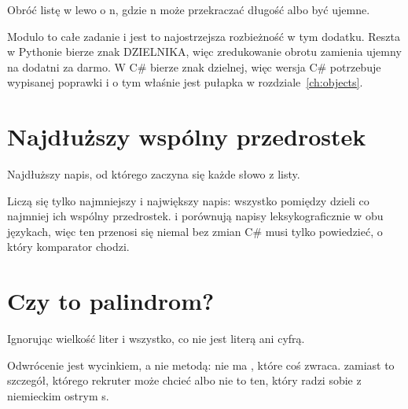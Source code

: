 \noindent
Obróć listę w lewo o n, gdzie n może przekraczać długość albo być ujemne.



\noindent
Modulo to całe zadanie i jest to najostrzejsza rozbieżność w tym dodatku. Reszta w Pythonie bierze znak DZIELNIKA, więc zredukowanie obrotu zamienia ujemny na dodatni za darmo. W C\# bierze znak dzielnej, więc wersja C\# potrzebuje wypisanej poprawki \dash{} i o tym właśnie jest pułapka w rozdziale~\ref{ch:objects}.

\section{Najdłuższy wspólny przedrostek}
\label{sec:appD-prefix}

\noindent
Najdłuższy napis, od którego zaczyna się każde słowo z listy.



\noindent
Liczą się tylko najmniejszy i największy napis: wszystko pomiędzy dzieli co najmniej ich wspólny przedrostek.  i  porównują napisy leksykograficznie w obu językach, więc ten przenosi się niemal bez zmian \dash{} C\# musi tylko powiedzieć, o który komparator chodzi.

\section{Czy to palindrom?}
\label{sec:appD-palindrome}

\noindent
Ignorując wielkość liter i wszystko, co nie jest literą ani cyfrą.



\noindent
Odwrócenie jest wycinkiem, a nie metodą: nie ma , które coś zwraca.  zamiast  to szczegół, którego rekruter może chcieć albo nie \dash{} to ten, który radzi sobie z niemieckim ostrym s.

